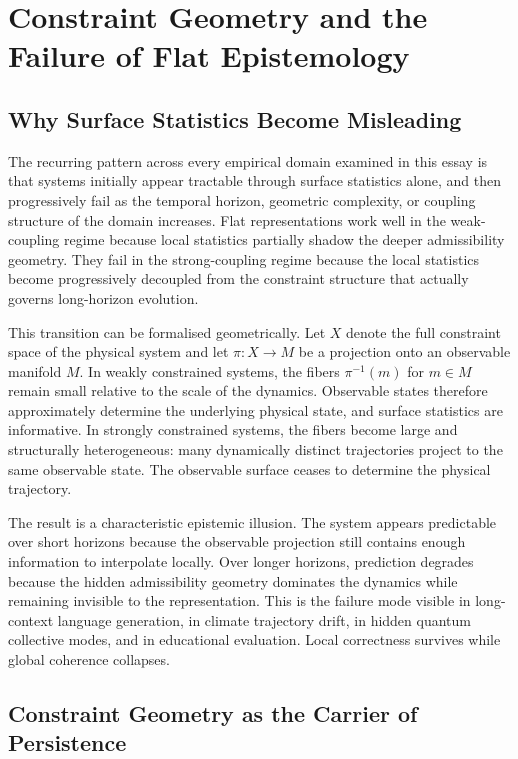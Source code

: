 \documentclass[11pt,a4paper]{article}
\theoremstyle{plain}
\theoremstyle{definition}
\theoremstyle{remark}
\begin{document}
\section{Constraint Geometry and the Failure of Flat Epistemology}
\label{sec:flat}

\subsection{Why Surface Statistics Become Misleading}

The recurring pattern across every empirical domain examined in this essay
is that systems initially appear tractable through surface statistics alone,
and then progressively fail as the temporal horizon, geometric complexity,
or coupling structure of the domain increases. Flat representations work
well in the weak-coupling regime because local statistics partially shadow
the deeper admissibility geometry. They fail in the strong-coupling regime
because the local statistics become progressively decoupled from the
constraint structure that actually governs long-horizon evolution.

This transition can be formalised geometrically. Let $X$ denote the full
constraint space of the physical system and let $\pi: X \to M$ be a
projection onto an observable manifold $M$. In weakly constrained systems,
the fibers $\pi^{-1}(m)$ for $m \in M$ remain small relative to the scale
of the dynamics. Observable states therefore approximately determine the
underlying physical state, and surface statistics are informative. In
strongly constrained systems, the fibers become large and structurally
heterogeneous: many dynamically distinct trajectories project to the same
observable state. The observable surface ceases to determine the physical
trajectory.

The result is a characteristic epistemic illusion. The system appears
predictable over short horizons because the observable projection still
contains enough information to interpolate locally. Over longer horizons,
prediction degrades because the hidden admissibility geometry dominates
the dynamics while remaining invisible to the representation. This is the
failure mode visible in long-context language generation, in climate
trajectory drift, in hidden quantum collective modes, and in educational
evaluation. Local correctness survives while global coherence collapses.

\subsection{Constraint Geometry as the Carrier of Persistence}
\end{document}

